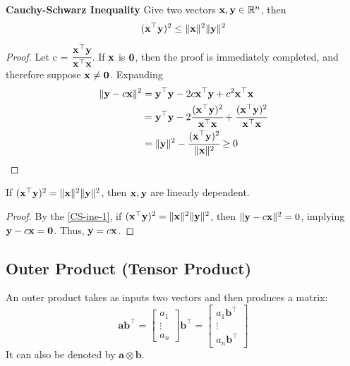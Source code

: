 \begin{Thm}\label{CS-ine}
    \textbf{Cauchy-Schwarz Inequality} Give two vectors $\mathbf{x}, \mathbf{y}\in \mathbb{R}^n$, then 
    \begin{equation}
        (\mathbf{x}^{\top}\mathbf{y})^2 \leq \lVert \mathbf{x}\rVert^2 \lVert \mathbf{y}\rVert^2
    \end{equation}
    \begin{proof}
        Let c = $\cfrac{\mathbf{x}^{\top}\mathbf{y}}{\mathbf{x}^{\top}\mathbf{x}}$. If $\mathbf{x}$ is $\mathbf{0}$, then the proof is immediately completed, and therefore suppose $\mathbf{x}\neq \mathbf{0}$. Expanding
        \begin{align}
            \lVert \mathbf{y} - c\mathbf{x}\rVert^2 &= \mathbf{y}^{\top}\mathbf{y} - 2c\mathbf{x}^{\top}\mathbf{y} + c^2\mathbf{x}^{\top}\mathbf{x}\\
            & = \mathbf{y}^{\top}\mathbf{y} - 2\cfrac{(\mathbf{x}^{\top}\mathbf{y})^2}{\mathbf{x}^{\top}\mathbf{x}} + \cfrac{(\mathbf{x}^{\top}\mathbf{y})^2}{\mathbf{x}^{\top}\mathbf{x}}\\
            & = \lVert \mathbf{y} \rVert^2 - \cfrac{(\mathbf{x}^{\top}\mathbf{y})^2}{\lVert \mathbf{x} \rVert^2}\geq 0 \label{CS-ine-1}
        \end{align}
    \end{proof}
\end{Thm}
\begin{Thm}
    If $(\mathbf{x}^{\top}\mathbf{y})^2 = \lVert \mathbf{x}\rVert^2 \lVert \mathbf{y}\rVert^2$, then $\mathbf{x}, \mathbf{y}$ are linearly dependent.
    \begin{proof}
        By the \cref{CS-ine-1}, if $(\mathbf{x}^{\top}\mathbf{y})^2 = \lVert \mathbf{x}\rVert^2 \lVert \mathbf{y}\rVert^2$, then $\lVert \mathbf{y} - c\mathbf{x}\rVert^2 = 0$, implying $\mathbf{y} - c\mathbf{x} = \mathbf{0}$. Thus, $\mathbf{y} = c\mathbf{x}$.
    \end{proof}
\end{Thm}
\subsection{Outer Product (Tensor Product)}
An outer product takes as inputs two vectors and then produces a matrix:
\begin{equation*}
    \mathbf{a}\mathbf{b}^{\top} = \begin{bmatrix}
        a_1\\
        \vdots\\
        a_n
    \end{bmatrix} \mathbf{b}^{\top} = 
    \begin{bmatrix}
        a_1\mathbf{b}^{\top}\\
        \vdots\\
        a_n\mathbf{b}^{\top}
    \end{bmatrix}
\end{equation*}
It can also be denoted by $\mathbf{a}\otimes \mathbf{b}$.